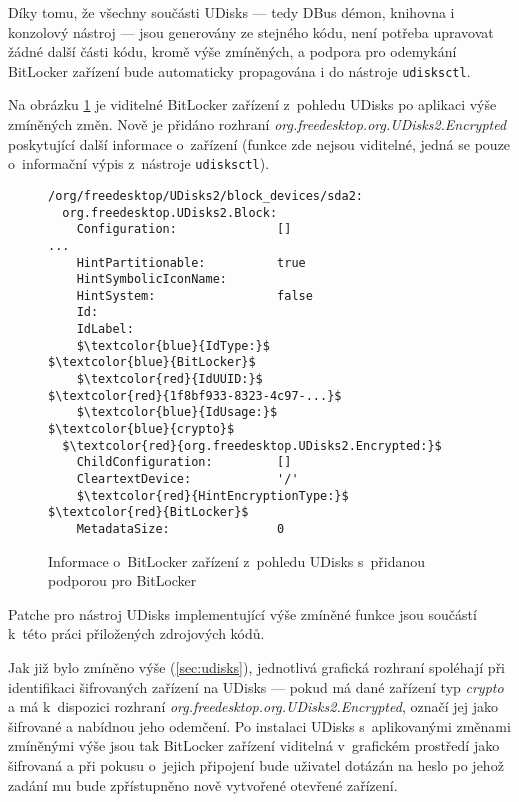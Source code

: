 Díky tomu, že všechny součásti UDisks --- tedy DBus démon, knihovna i konzolový nástroj --- jsou generovány ze stejného kódu, není potřeba upravovat žádné další části kódu, kromě výše zmíněných, a podpora pro odemykání BitLocker zařízení bude automaticky propagována i do nástroje \texttt{udisksctl}.

Na obrázku \ref{fig:udisks-bitlocker-with-support} je viditelné BitLocker zařízení z~pohledu UDisks po aplikaci výše zmíněných změn. Nově je přidáno rozhraní \emph{org.freedesktop.org.UDisks2.Encrypted} po\-sky\-tu\-jí\-cí další informace o~zařízení (funkce zde nejsou viditelné, jedná se pouze o~informační výpis z~nástroje \texttt{udisksctl}).

\begin{figure}[h]
		\centering
		\captionsetup{width=0.65\linewidth}
\begin{center}
\centering
\begin{lstlisting}[frame=none, escapechar=$, basicstyle=\ttfamily\small, columns=fullflexible, keepspaces=true, xleftmargin=.2\textwidth, xrightmargin=.2\textwidth]
/org/freedesktop/UDisks2/block_devices/sda2:
  org.freedesktop.UDisks2.Block:
    Configuration:              []
...
    HintPartitionable:          true
    HintSymbolicIconName:
    HintSystem:                 false
    Id:
    IdLabel:
    $\textcolor{blue}{IdType:}$                     $\textcolor{blue}{BitLocker}$
    $\textcolor{red}{IdUUID:}$                     $\textcolor{red}{1f8bf933-8323-4c97-...}$
    $\textcolor{blue}{IdUsage:}$                    $\textcolor{blue}{crypto}$
  $\textcolor{red}{org.freedesktop.UDisks2.Encrypted:}$
    ChildConfiguration:         []
    CleartextDevice:            '/'
    $\textcolor{red}{HintEncryptionType:}$          $\textcolor{red}{BitLocker}$
    MetadataSize:               0

\end{lstlisting}
\end{center}
		\caption{Informace o~BitLocker zařízení z~pohledu UDisks s~přidanou podporou pro BitLocker}
		\label{fig:udisks-bitlocker-with-support}
\end{figure}

Patche pro nástroj UDisks implementující výše zmíněné funkce jsou součástí k~této práci přiložených zdrojových kódů.


Jak již bylo zmíněno výše (\ref{sec:udisks}), jednotlivá grafická rozhraní spoléhají při identifikaci šifrovaných zařízení na UDisks --- pokud má dané zařízení typ \emph{crypto} a má k~dispozici rozhraní \emph{org.freedesktop.org.UDisks2.Encrypted}, označí jej jako šifrované a nabídnou jeho odemčení. Po instalaci UDisks s~aplikovanými změnami zmíněnými výše jsou tak BitLocker zařízení viditelná v~grafickém prostředí jako šifrovaná a při pokusu o~jejich připojení bude uživatel dotázán na heslo po jehož zadání mu bude zpřístupněno nově vytvořené otevřené zařízení.

